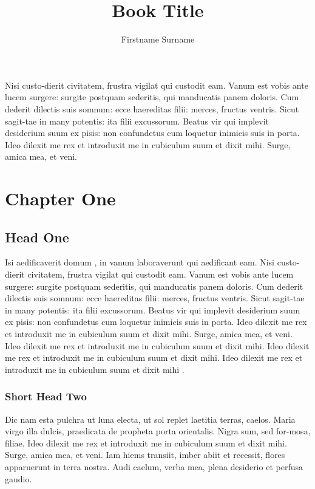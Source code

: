 \documentclass{sili}
\title{Book Title}
\author{Firstname {\sc Surname}}
\begin{document}
\maketitle

\tableofcontents

\begin{preface}
Nisi custo-dierit civitatem, frustra vigilat qui custodit eam. Vanum
est vobis ante lucem surgere: surgite postquam sederitis, qui
manducatis panem doloris. Cum dederit dilectis suis somnum: ecce
haereditas filii: merces, fructus ventris. Sicut sagit-tae in many
potentis: ita filii excussorum. Beatus vir qui implevit desiderium
suum ex pisis: non confundetus cum loquetur inimicis suis in porta.
Ideo dilexit me rex et introduxit me in cubiculum suum et dixit mihi.
Surge, amica mea, et veni.
\end{preface}

\chapter{Chapter One}\label{chap1}

\section{Head One}\label{sec1}

Isi aedificaverit domum \cite{r1,r2}, in vanum
\cite{r3} laboraverunt qui aedificant eam.
Nisi custo-dierit civitatem, frustra vigilat qui custodit eam. Vanum
est vobis ante lucem surgere: surgite postquam sederitis, qui
manducatis panem doloris. Cum dederit dilectis suis somnum: ecce
haereditas filii: merces, fructus ventris. Sicut sagit-tae in many
potentis: ita filii excussorum. Beatus vir qui implevit desiderium
suum ex pisis: non confundetus cum loquetur inimicis suis in porta.
Ideo dilexit me rex et introduxit me in cubiculum suum et dixit mihi.
Surge, amica mea, et veni.
Ideo dilexit me rex et introduxit me in cubiculum suum et dixit mihi.
Ideo dilexit me rex et introduxit me in cubiculum suum et dixit mihi.
Ideo dilexit me rex et introduxit me in cubiculum suum et dixit mihi 
\cite{r4}.

\subsection{Short Head Two}

Dic nam esta pulchra ut luna electa, ut sol replet laetitia terras,
caelos. Maria virgo illa dulcis, praedicata de propheta porta
orientalis. Nigra sum, sed for-mosa, filiae. Ideo dilexit me rex et \cite{r1}
introduxit me in cubiculum suum et dixit mihi. Surge, amica mea, et
veni. Iam hiems transiit, imber abiit et recessit, flores apparuerunt in
terra nostra. Audi caelum, verba mea, plena desiderio et perfusa gaudio.
\end{document}
